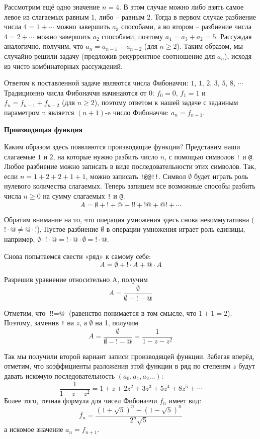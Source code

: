 \documentclass[12pt, letterpaper]{extarticle}
\begin{document}
Рассмотрим ещё одно значение $n=4$. В этом случае можно либо взять самое левое из слагаемых равным $1$, либо -- равным $2$. Тогда в первом случае разбиение числа $4=1+\cdots$ можно завершить $a_3$ способами, а во втором -- разбиение числа $4=2+\cdots$ можно завершить $a_2$ способами, поэтому $a_4=a_3+a_2=5$. Рассуждая аналогично, получим, что $a_n=a_{n-1}+a_{n-2}$ (для $n\geq2$). Таким образом, мы случайно решили задачу (предложив рекуррентное соотношение для $a_n$), исходя из чисто комбинаторных рассуждений.

Ответом к поставленной задаче являются числа Фибоначчи: $1$, $1$, $2$, $3$, $5$, $8$, $\cdots$ Традиционно числа Фибоначчи начинаются от $0$: $f_0=0$, $f_1=1$ и $f_n=f_{n-1}+f_{n-2}$ (для $n\geq2$), поэтому ответом к нашей задаче с заданным параметром n является $(n+1)$-e число Фибоначчи: $a_n=f_{n+1}$.

\textbf{Производящая функция}

Каким образом здесь появляются производящие функции? Представим наши слагаемые $1$ и $2$, на которые нужно разбить число $n$, с помощью символов \texttt{!} и \texttt{@}. Любое разбиение можно записать в виде последовательности этих символов. Так, если $n=1+2+2+1+1$, можно записать \texttt{!@@!!}. Символ $\emptyset$ будет играть роль нулевого количества слагаемых. Теперь запишем все возможные способы разбить числа $n\geq0$ на сумму слагаемых \texttt{!} и \texttt{@}:
\[A=\emptyset+\texttt{!}+\texttt{@}+\texttt{!!}+\texttt{!@}+\texttt{@!}+\cdots\]

Обратим внимание на то, что операция умножения здесь снова некоммутативна ($\texttt{!}\cdot\texttt{@}\neq\texttt{@}\cdot\texttt{!}$), Пустое разбиение $\emptyset$ в операции умножения играет роль единицы, например, $\emptyset\cdot\texttt{!}\cdot\texttt{@}=\texttt{!}\cdot\texttt{@}\cdot\emptyset=\texttt{!}\cdot\texttt{@}$.

Снова попытаемся свести «ряд» к самому себе:
\[A=\emptyset+\texttt{!}\cdot A+\texttt{@}\cdot A\]

Разрешив уравнение относительно A, получим
\[A=\frac{\emptyset}{\emptyset-\texttt{!}-\texttt{@}}\]

Отметим, что $\texttt{!}\texttt{!}=\texttt{@}$ (равенство понимается в том смысле, что $1+1=2$). Поэтому, заменив \texttt{!} на $z$, а $\emptyset$ на 1, получим
\[A=\frac{\emptyset}{\emptyset-\texttt{!}-\texttt{@}}=\frac{1}{1-z-z^2}\]

Так мы получили второй вариант записи производящей функции. Забегая вперёд, отметим, что коэффициенты разложения этой функции в ряд по степеням $z$ будут давать искомую последовательность $(a_0,a_1,a_2\dots)$:
\[\frac{1}{1-z-z^2}=1+z+2z^2+3z^3+5z^4+8z^5+\cdots\]
Более того, точная формула для чисел Фибоначчи $f_n$ имеет вид:
\[f_n=\frac{(1+\sqrt{5})^n-(1-\sqrt{5})^n}{2^n\sqrt{5}}\]
а искомое значение $a_n=f_{n+1}$.
\end{document}
